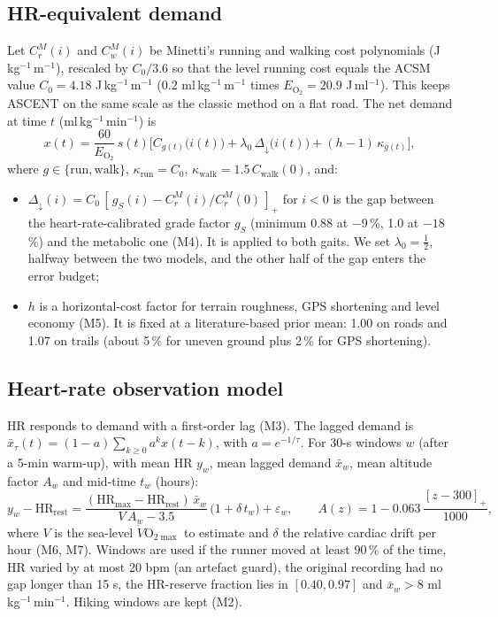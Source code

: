 \documentclass[11pt,a4paper]{article}
\newcommand{\VOmax}{\ensuremath{\dot V\mathrm{O}_{2\max}}}
\newcommand{\unit}{ml\,kg$^{-1}$\,min$^{-1}$}
\newcommand{\HRmax}{\ensuremath{\mathrm{HR}_{\max}}}
\newcommand{\HRrest}{\ensuremath{\mathrm{HR}_{\mathrm{rest}}}}
\newcommand{\ascent}{ASCENT}
\begin{document}
\subsection{HR-equivalent demand}
Let $C_r^{M}(i)$ and $C_w^{M}(i)$ be Minetti's running and walking cost polynomials (J\,kg$^{-1}$\,m$^{-1}$), rescaled by $C_0/3.6$ so that the level running cost equals the ACSM value $C_0=4.18$ J\,kg$^{-1}$\,m$^{-1}$ ($0.2$ ml\,kg$^{-1}$\,m$^{-1}$ times $E_{\mathrm O_2}=20.9$ J\,ml$^{-1}$). This keeps \ascent{} on the same scale as the classic method on a flat road. The net demand at time $t$ (\unit) is
\begin{equation}
x(t)=\frac{60}{E_{\mathrm O_2}}\,s(t)\Big[C_{g(t)}\big(i(t)\big)+\lambda_0\,\Delta_{\downarrow}\big(i(t)\big)+(h-1)\,\kappa_{g(t)}\Big],
\label{eq:demand}
\end{equation}
where $g\in\{\mathrm{run},\mathrm{walk}\}$, $\kappa_{\mathrm{run}}=C_0$, $\kappa_{\mathrm{walk}}=1.5\,C_{\mathrm{walk}}(0)$, and:
\begin{itemize}[leftmargin=*]
\item $\Delta_\downarrow(i)=C_0\,[\,g_S(i)-C_r^M(i)/C_r^M(0)\,]_+$ for $i<0$ is the gap between the heart-rate-calibrated grade factor $g_S$ (minimum 0.88 at $-9$\,\%, 1.0 at $-18$\,\%) and the metabolic one (M4). It is applied to both gaits. We set $\lambda_0=\tfrac12$, halfway between the two models, and the other half of the gap enters the error budget;
\item $h$ is a horizontal-cost factor for terrain roughness, GPS shortening and level economy (M5). It is fixed at a literature-based prior mean: 1.00 on roads and 1.07 on trails (about 5\,\% for uneven ground plus 2\,\% for GPS shortening).
\end{itemize}

\subsection{Heart-rate observation model}
HR responds to demand with a first-order lag (M3). The lagged demand is $\bar x_\tau(t)=(1-a)\sum_{k\ge0}a^k x(t-k)$, with $a=e^{-1/\tau}$. For 30-s windows $w$ (after a 5-min warm-up), with mean HR $y_w$, mean lagged demand $\bar x_w$, mean altitude factor $A_w$ and mid-time $t_w$ (hours):
\begin{equation}
y_w-\HRrest=\frac{(\HRmax-\HRrest)\,\bar x_w}{V\,A_w-3.5}\,\big(1+\delta\,t_w\big)+\varepsilon_w,\qquad
A(z)=1-0.063\,\frac{[z-300]_+}{1000},
\label{eq:obs}
\end{equation}
where $V$ is the sea-level \VOmax{} to estimate and $\delta$ the relative cardiac drift per hour (M6, M7). Windows are used if the runner moved at least 90\,\% of the time, HR varied by at most 20 bpm (an artefact guard), the original recording had no gap longer than 15 s, the HR-reserve fraction lies in $[0.40,0.97]$ and $\bar x_w>8$ \unit. Hiking windows are kept (M2).
\end{document}
